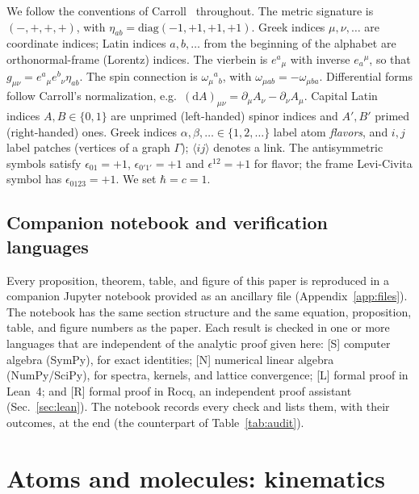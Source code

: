 \documentclass[reprint,aps,prd,amsmath,amssymb,superscriptaddress,nofootinbib,floatfix]{revtex4-2}
\theoremstyle{plain}
\theoremstyle{definition}
\theoremstyle{remark}
\newcommand{\dd}{\mathrm{d}}
\begin{document}
We follow the conventions of Carroll~\cite{Carroll2019} throughout. The metric signature is
$(-,+,+,+)$, with $\eta_{ab}=\mathrm{diag}(-1,+1,+1,+1)$. Greek indices $\mu,\nu,\ldots$ are
coordinate indices; Latin indices $a,b,\ldots$ from the beginning of the alphabet are orthonormal-frame
(Lorentz) indices. The vierbein is $e^a{}_\mu$ with inverse $e_a{}^\mu$, so that
$g_{\mu\nu}=e^a{}_\mu e^b{}_\nu\eta_{ab}$. The spin connection is $\omega_\mu{}^a{}_b$, with
$\omega_{\mu ab}=-\omega_{\mu ba}$. Differential forms follow Carroll's normalization, e.g.\
$(\dd A)_{\mu\nu}=\partial_\mu A_\nu-\partial_\nu A_\mu$. Capital Latin indices $A,B\in\{0,1\}$ are
unprimed (left-handed) spinor indices and $A',B'$ primed (right-handed) ones. Greek indices
$\alpha,\beta,\ldots\in\{1,2,\ldots\}$ label atom \emph{flavors}, and $i,j$ label patches (vertices of a
graph $\Gamma$); $\langle ij\rangle$ denotes a link. The antisymmetric symbols satisfy $\epsilon_{01}=+1$,
$\epsilon_{0'1'}=+1$ and $\epsilon^{12}=+1$ for flavor; the frame Levi-Civita symbol has
$\epsilon_{0123}=+1$. We set $\hbar=c=1$.

\subsection{Companion notebook and verification languages}
\label{sec:notebookintro}

Every proposition, theorem, table, and figure of this paper is reproduced in a companion Jupyter notebook
provided as an ancillary file (Appendix~\ref{app:files}). The notebook has the same section structure and the
same equation, proposition, table, and figure numbers as the paper. Each result is checked in one or more
languages that are independent of the analytic proof given here: [S] computer algebra (SymPy), for exact
identities; [N] numerical linear algebra (NumPy/SciPy), for spectra, kernels, and lattice convergence; [L]
formal proof in Lean~4; and [R] formal proof in Rocq, an independent proof assistant (Sec.~\ref{sec:lean}). The notebook records every check and lists
them, with their outcomes, at the end (the counterpart of Table~\ref{tab:audit}).

\section{Atoms and molecules: kinematics}
\label{sec:kinematics}
\end{document}
